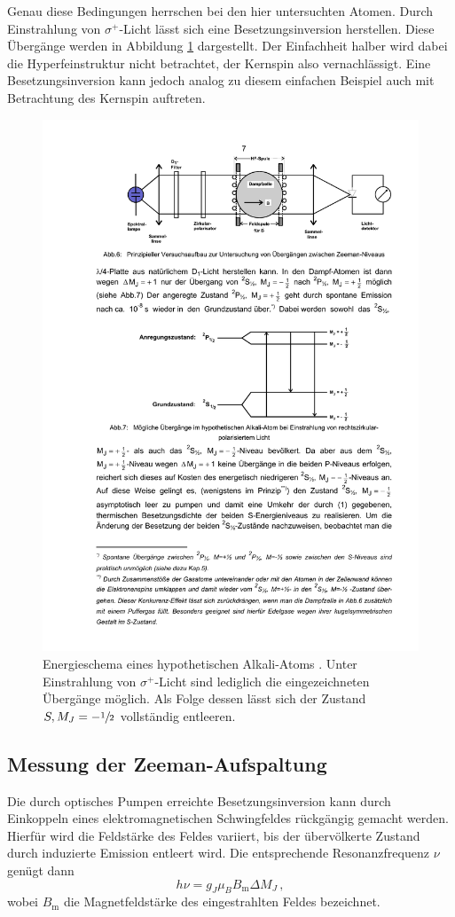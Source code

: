 Genau diese Bedingungen herrschen bei den hier untersuchten Atomen.
Durch Einstrahlung von $\sigma^+$-Licht lässt sich eine Besetzungsinversion
herstellen. Diese Übergänge werden in Abbildung \ref{fig:besetzungsinversion}
dargestellt. Der Einfachheit halber wird dabei die Hyperfeinstruktur nicht
betrachtet, der Kernspin also vernachlässigt. Eine Besetzungsinversion kann
jedoch analog zu diesem einfachen Beispiel auch mit Betrachtung des Kernspin
auftreten.
\begin{figure}
    \centering
    \includegraphics[width=0.7\linewidth]{img/besetzungsinversion}
    \caption{
        Energieschema eines hypothetischen Alkali-Atoms \cite{V21}. Unter Einstrahlung von
        $\sigma^+$-Licht sind lediglich die eingezeichneten Übergänge möglich.
        Als Folge dessen lässt sich der Zustand $S, M_J=-\sfrac{1}{2}$
        vollständig entleeren.
    }
    \label{fig:besetzungsinversion}
\end{figure}

\subsection{Messung der Zeeman-Aufspaltung}
\label{subsec:messung}
Die durch optisches Pumpen erreichte Besetzungsinversion kann durch Einkoppeln
eines elektromagnetischen Schwingfeldes rückgängig gemacht werden. Hierfür wird
die Feldstärke des Feldes variiert, bis der übervölkerte Zustand durch
induzierte Emission entleert wird. Die entsprechende Resonanzfrequenz $\nu$
genügt dann
\begin{equation}
\label{eq:resonanz}
    h\nu = g_J \mu_B B_\text{m} \Delta M_J\,,
\end{equation}
wobei $B_\text{m}$ die Magnetfeldstärke des eingestrahlten Feldes bezeichnet.

